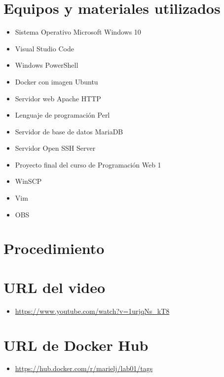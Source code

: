 \documentclass{article}
\begin{document}
\section{Equipos y materiales utilizados}
\begin{itemize}
	\item Sistema Operativo Microsoft Windows 10
	\item Visual Studio Code
	\item Windows PowerShell
	\item Docker con imagen Ubuntu
	\item Servidor web Apache HTTP
	\item Lenguaje de programación Perl
	\item Servidor de base de datos MariaDB
	\item Servidor Open SSH Server
	\item Proyecto final del curso de Programación Web 1 
	\item WinSCP
	\item Vim
	\item OBS
\end{itemize}

\section{Procedimiento}

\section{URL del video}
\begin{itemize}
	\item \url{https://www.youtube.com/watch?v=1urjqNs_kT8}
\end{itemize}

\section{URL de Docker Hub}
\begin{itemize}
	\item \url{https://hub.docker.com/r/marielj/lab01/tags}
\end{itemize}
\end{document}

